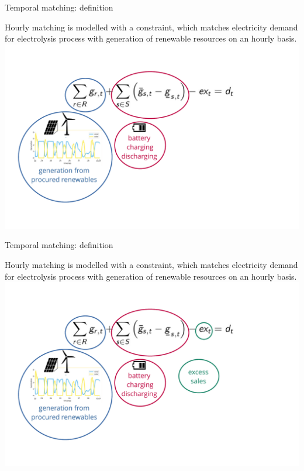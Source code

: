 \begin{frame}{Temporal matching: definition}
	\addtocounter{framenumber}{-1}
	\alert{Hourly matching} is modelled with a constraint, 
	which matches electricity demand for electrolysis process with generation of renewable resources on an hourly basis. 
	\centering
	\includegraphics[width=0.6\linewidth, clip, trim={0cm 0cm 0cm 0cm}]{images/hourly_eq_explained_v2}
	

\end{frame}
\begin{frame}{Temporal matching: definition}
	\addtocounter{framenumber}{-1}
	\alert{Hourly matching} is modelled with a constraint, 
	which matches electricity demand for electrolysis process with generation of renewable resources on an hourly basis. 
	\centering
	\includegraphics[width=0.6\linewidth, clip, trim={0cm 0cm 0cm 0cm}]{images/hourly_eq_explained_v3}
	

\end{frame}
